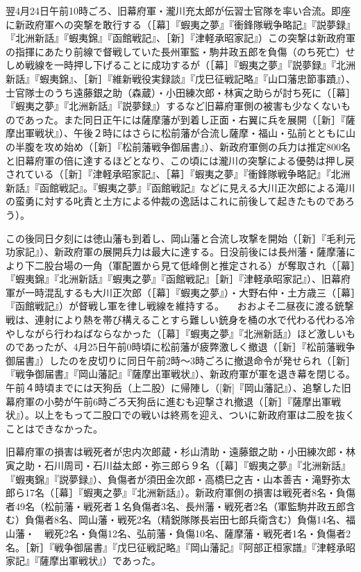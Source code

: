 \documentclass[11pt,report]{jsarticle}
\begin{document}
翌4月24日午前10時ごろ、旧幕府軍・瀧川充太郎が伝習士官隊を率い合流。即座に新政府軍への突撃を敢行する（［幕］『蝦夷之夢』『衝鋒隊戦争略記』『説夢録』『北洲新話』『蝦夷錦』『函館戦記』、［新］『津軽承昭家記』）この突撃は新政府軍の指揮にあたり前線で督戦していた長州軍監・駒井政五郎を負傷（のち死亡）せしめ戦線を一時押し下げることに成功するが（［幕］『蝦夷之夢』『説夢録』『北洲新話』『蝦夷錦』、［新］『維新戦役実録談』『戊巳征戦記略』『山口藩忠節事蹟』）、士官隊士のうち遠藤銀之助（森蔵）・小田練次郎・林寅之助らが討ち死に（［幕］『蝦夷之夢』『北洲新話』『説夢録』）するなど旧幕府軍側の被害も少なくないものであった。また同日正午には薩摩藩が到着し正面・右翼に兵を展開（［新］『薩摩出軍戦状』）、午後２時にはさらに松前藩が合流し薩摩・福山・弘前とともに山の半腹を攻め始め（［新］『松前藩戦争御届書』）、新政府軍側の兵力は推定800名と旧幕府軍の倍に達するほどとなり、この頃には瀧川の突撃による優勢は押し戻されている（［新］『津軽承昭家記』、［幕］『蝦夷之夢』『衝鋒隊戦争略記』『北洲新話』『函館戦記』。『蝦夷之夢』『函館戦記』などに見える大川正次郎による滝川の蛮勇に対する叱責と土方による仲裁の逸話はこれに前後して起きたものであろう）。

この後同日夕刻には徳山藩も到着し、岡山藩と合流し攻撃を開始（［新］『毛利元功家記』）、新政府軍の展開兵力は最大に達する。日没前後には長州藩・薩摩藩により下二股台場の一角（軍配置から見て低峰側と推定される）が奪取され（［幕］『蝦夷錦』『北洲新話』『蝦夷之夢』『函館戦記』［新］『津軽承昭家記』）、旧幕府軍が一時混乱するも大川正次郎（［幕］『蝦夷之夢』）・大野右仲・土方歳三（［幕］『函館戦記』）が督戦し軍を律し戦線を維持する。
　おおよそ二昼夜に渡る銃撃戦は、連射により熱を帯び構えることすら難しい銃身を桶の水で代わる代わる冷やしながら行わねばならなかった（［幕］『蝦夷之夢』『北洲新話』）ほど激しいものであったが、4月25日午前0時頃に松前藩が疲弊激しく撤退（［新］『松前藩戦争御届書』）したのを皮切りに同日午前2時～3時ごろに撤退命令が発せられ（［新］『戦争御届書』『岡山藩記』『薩摩出軍戦状』）、新政府軍が軍を退き幕を閉じる。午前４時頃までには天狗岳（上二股）に帰陣し（[新]『岡山藩記』）、追撃した旧幕府軍の小勢が午前6時ごろ天狗岳に進むも迎撃され撤退（［新］『薩摩出軍戦状』）。以上をもって二股口での戦いは終焉を迎え、ついに新政府軍は二股を抜くことはできなかった。

旧幕府軍の損害は戦死者が忠内次郎蔵・杉山清助・遠藤銀之助・小田練次郎・林寅之助・石川周司・石川益太郎・弥三郎ら９名（［幕］『蝦夷之夢』『北洲新話』『蝦夷錦』『説夢録』）、負傷者が須田金次郎・高橋巳之吉・山本善吉・滝野弥太郎ら17名（［幕］『蝦夷之夢』『北洲新話』）。新政府軍側の損害は戦死者8名・負傷者49名（松前藩・戦死者１名負傷者3名、長州藩・戦死者2名（軍監駒井政五郎含む）負傷者8名、岡山藩・戦死2名（精鋭隊隊長岩田七郎兵衛含む）負傷14名、福山藩・　戦死2名・負傷12名、弘前藩・負傷10名、薩摩藩・戦死者1名・負傷者2名。［新］『戦争御届書』『戊巳征戦記略』『岡山藩記』『阿部正桓家譜』『津軽承昭家記』『薩摩出軍戦状』）であった。
\end{document}
